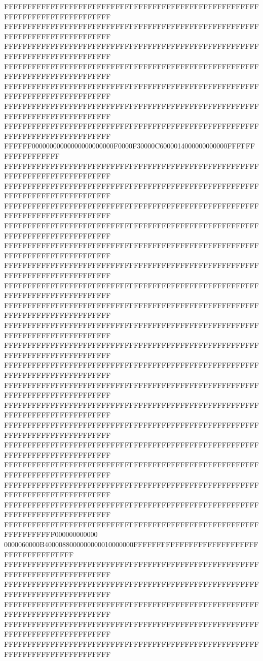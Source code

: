 FFFFFFFFFFFFFFFFFFFFFFFFFFFFFFFFFFFFFFFFFFFFFFFFFFFFFFFFFFFFFFFFFFFFFFFFFFFFFF
FFFFFFFFFFFFFFFFFFFFFFFFFFFFFFFFFFFFFFFFFFFFFFFFFFFFFFFFFFFFFFFFFFFFFFFFFFFFFF
FFFFFFFFFFFFFFFFFFFFFFFFFFFFFFFFFFFFFFFFFFFFFFFFFFFFFFFFFFFFFFFFFFFFFFFFFFFFFF
FFFFFFFFFFFFFFFFFFFFFFFFFFFFFFFFFFFFFFFFFFFFFFFFFFFFFFFFFFFFFFFFFFFFFFFFFFFFFF
FFFFFFFFFFFFFFFFFFFFFFFFFFFFFFFFFFFFFFFFFFFFFFFFFFFFFFFFFFFFFFFFFFFFFFFFFFFFFF
FFFFFFFFFFFFFFFFFFFFFFFFFFFFFFFFFFFFFFFFFFFFFFFFFFFFFFFFFFFFFFFFFFFFFFFFFFFFFF
FFFFFFFFFFFFFFFFFFFFFFFFFFFFFFFFFFFFFFFFFFFFFFFFFFFFFFFFFFFFFFFFFFFFFFFFFFFFFF
FFFFFF00000000000000000000000F0000F30000C6000014000000000000FFFFFFFFFFFFFFFFFF
FFFFFFFFFFFFFFFFFFFFFFFFFFFFFFFFFFFFFFFFFFFFFFFFFFFFFFFFFFFFFFFFFFFFFFFFFFFFFF
FFFFFFFFFFFFFFFFFFFFFFFFFFFFFFFFFFFFFFFFFFFFFFFFFFFFFFFFFFFFFFFFFFFFFFFFFFFFFF
FFFFFFFFFFFFFFFFFFFFFFFFFFFFFFFFFFFFFFFFFFFFFFFFFFFFFFFFFFFFFFFFFFFFFFFFFFFFFF
FFFFFFFFFFFFFFFFFFFFFFFFFFFFFFFFFFFFFFFFFFFFFFFFFFFFFFFFFFFFFFFFFFFFFFFFFFFFFF
FFFFFFFFFFFFFFFFFFFFFFFFFFFFFFFFFFFFFFFFFFFFFFFFFFFFFFFFFFFFFFFFFFFFFFFFFFFFFF
FFFFFFFFFFFFFFFFFFFFFFFFFFFFFFFFFFFFFFFFFFFFFFFFFFFFFFFFFFFFFFFFFFFFFFFFFFFFFF
FFFFFFFFFFFFFFFFFFFFFFFFFFFFFFFFFFFFFFFFFFFFFFFFFFFFFFFFFFFFFFFFFFFFFFFFFFFFFF
FFFFFFFFFFFFFFFFFFFFFFFFFFFFFFFFFFFFFFFFFFFFFFFFFFFFFFFFFFFFFFFFFFFFFFFFFFFFFF
FFFFFFFFFFFFFFFFFFFFFFFFFFFFFFFFFFFFFFFFFFFFFFFFFFFFFFFFFFFFFFFFFFFFFFFFFFFFFF
FFFFFFFFFFFFFFFFFFFFFFFFFFFFFFFFFFFFFFFFFFFFFFFFFFFFFFFFFFFFFFFFFFFFFFFFFFFFFF
FFFFFFFFFFFFFFFFFFFFFFFFFFFFFFFFFFFFFFFFFFFFFFFFFFFFFFFFFFFFFFFFFFFFFFFFFFFFFF
FFFFFFFFFFFFFFFFFFFFFFFFFFFFFFFFFFFFFFFFFFFFFFFFFFFFFFFFFFFFFFFFFFFFFFFFFFFFFF
FFFFFFFFFFFFFFFFFFFFFFFFFFFFFFFFFFFFFFFFFFFFFFFFFFFFFFFFFFFFFFFFFFFFFFFFFFFFFF
FFFFFFFFFFFFFFFFFFFFFFFFFFFFFFFFFFFFFFFFFFFFFFFFFFFFFFFFFFFFFFFFFFFFFFFFFFFFFF
FFFFFFFFFFFFFFFFFFFFFFFFFFFFFFFFFFFFFFFFFFFFFFFFFFFFFFFFFFFFFFFFFFFFFFFFFFFFFF
FFFFFFFFFFFFFFFFFFFFFFFFFFFFFFFFFFFFFFFFFFFFFFFFFFFFFFFFFFFFFFFFFFFFFFFFFFFFFF
FFFFFFFFFFFFFFFFFFFFFFFFFFFFFFFFFFFFFFFFFFFFFFFFFFFFFFFFFFFFFFFFFFFFFFFFFFFFFF
FFFFFFFFFFFFFFFFFFFFFFFFFFFFFFFFFFFFFFFFFFFFFFFFFFFFFFFFFFFFFFFFFFFFFFFFFFFFFF
FFFFFFFFFFFFFFFFFFFFFFFFFFFFFFFFFFFFFFFFFFFFFFFFFFFFFFFFFFFFFFFFFF000000000000
0000060000B4000088000000000010000000FFFFFFFFFFFFFFFFFFFFFFFFFFFFFFFFFFFFFFFFFF
FFFFFFFFFFFFFFFFFFFFFFFFFFFFFFFFFFFFFFFFFFFFFFFFFFFFFFFFFFFFFFFFFFFFFFFFFFFFFF
FFFFFFFFFFFFFFFFFFFFFFFFFFFFFFFFFFFFFFFFFFFFFFFFFFFFFFFFFFFFFFFFFFFFFFFFFFFFFF
FFFFFFFFFFFFFFFFFFFFFFFFFFFFFFFFFFFFFFFFFFFFFFFFFFFFFFFFFFFFFFFFFFFFFFFFFFFFFF
FFFFFFFFFFFFFFFFFFFFFFFFFFFFFFFFFFFFFFFFFFFFFFFFFFFFFFFFFFFFFFFFFFFFFFFFFFFFFF
FFFFFFFFFFFFFFFFFFFFFFFFFFFFFFFFFFFFFFFFFFFFFFFFFFFFFFFFFFFFFFFFFFFFFFFFFFFFFF
